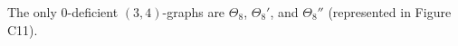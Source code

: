 The only $0$-deficient $(3, 4)$-graphs are $\Theta_8$, $\Theta_8'$, and $\Theta_8''$ (represented in Figure C11).
